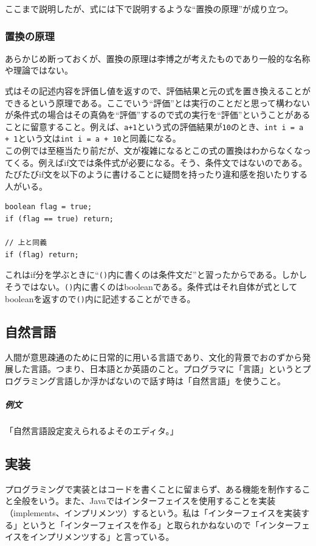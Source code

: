 \documentclass[a4paper]{ltjsreport}
\newcommand{\terlogy}[2][|]{\colorbox{terlogy}{\texttt{\lstinline#1#2#1}}}
\begin{document}
ここまで説明したが、式には下で説明するような``置換の原理''が成り立つ。

\subsubsection{置換の原理}
あらかじめ断っておくが、置換の原理は李博之が考えたものであり一般的な名称や理論ではない。\par
式はその記述内容を評価し値を返すので、評価結果と元の式を置き換えることができるという原理である。ここでいう``評価''とは実行のことだと思って構わないが条件式の場合はその真偽を``評価''するので式の実行を``評価''ということがあることに留意すること。例えば、\terlogy{a+1}という式の評価結果が\terlogy{10}のとき、\terlogy{int i = a + 1}という文は\terlogy{int i = a + 10}と同義になる。
\\

この例では至極当たり前だが、文が複雑になるとこの式の置換はわからなくなってくる。例えばif文では条件式が必要になる。そう、条件文ではないのである。たびたびif文を以下のように書けることに疑問を持ったり違和感を抱いたりする人がいる。

\lstset{language=C}
\begin{lstlisting}
boolean flag = true;
if (flag == true) return;

// 上と同義
if (flag) return;
\end{lstlisting}

これはif分を学ぶときに``\terlogy{()}内に書くのは条件文だ''と習ったからである。しかしそうではない。\terlogy{()}内に書くのはbooleanである。条件式はそれ自体が式としてbooleanを返すので\terlogy{()}内に記述することができる。

\subsection{自然言語}
人間が意思疎通のために日常的に用いる言語であり、文化的背景でおのずから発展した言語。つまり、日本語とか英語のこと。プログラマに「言語」というとプログラミング言語しか浮かばないので話す時は「自然言語」を使うこと。

\subparagraph{例文}「自然言語設定変えられるよそのエディタ。」

\subsection{実装}
プログラミングで実装とはコードを書くことに留まらず、ある機能を制作すること全般をいう。また、Javaではインターフェイスを使用することを実装（implements、インプリメンツ）するという。私は「インターフェイスを実装する」というと「インターフェイスを作る」と取られかねないので「インターフェイスをインプリメンツする」と言っている。
\end{document}
